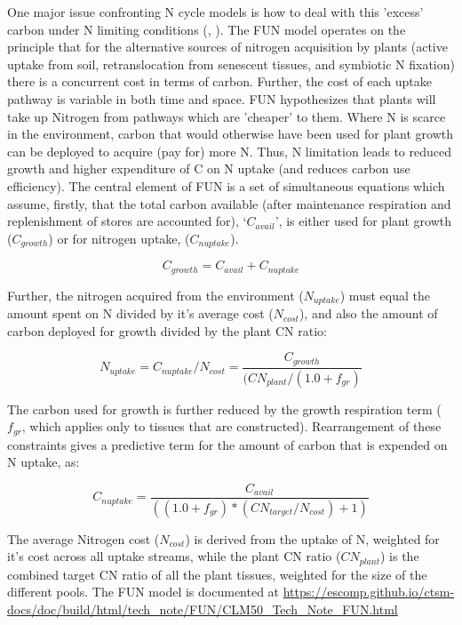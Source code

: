 \documentclass[draft,linenumbers]{agujournal}
\begin{document}
One major issue confronting N cycle models is how to deal with this 'excess' carbon under N limiting conditions (\cite{zaehle2010}, \cite{dekauwe2014}). The FUN model operates on the principle that for the alternative sources of nitrogen acquisition by plants (active uptake from soil, retranslocation from senescent tissues, and symbiotic N fixation) there is a concurrent cost in terms of carbon. Further, the cost of each uptake pathway is variable in both time and space. FUN hypothesizes that plants will take up Nitrogen from pathways which are 'cheaper' to them. Where N is scarce in the environment, carbon that would otherwise have been used for plant growth can be deployed to acquire (pay for) more N. Thus, N limitation leads to reduced growth and higher expenditure of C on N uptake (and reduces carbon use efficiency).  The central element of FUN is a set of simultaneous equations which assume, firstly, that the total carbon available (after maintenance respiration and replenishment of stores are accounted for), `$C_{avail}$', is either used for plant growth ($C_{growth}$) or for nitrogen uptake, ($C_{nuptake}$).

\begin{equation}
C_{growth}=C_{avail}+C_{nuptake}
\end{equation}

Further, the nitrogen acquired from the environment ($N_{uptake}$) must equal the amount spent on N divided by it's average cost ($N_{cost}$), and also the amount of carbon deployed for growth divided by the plant CN ratio:


\begin{equation}
N_{uptake}=C_{nuptake}/N_{cost} =\frac{C_{growth}}{(CN_{plant}/(1.0+f_{gr})}
\end{equation}

The carbon used for growth is further reduced by the growth respiration term ($f_{gr}$, which applies only to tissues that are constructed). Rearrangement of these constraints gives a predictive term for the amount of carbon that is expended on N uptake, as:

\begin{equation}
C_{nuptake} =\frac{C_{avail}}{ ( (1.0+f_{gr})*(CN_{target} / N_{cost}) + 1) }
\end{equation}


The average Nitrogen cost ($N_{cost}$) is derived from the uptake of N, weighted for it's cost across all uptake streams, while the plant CN ratio ($CN_{plant}$) is the combined target CN ratio of all the plant tissues, weighted for the size of the different pools. The FUN model is documented at \url{https://escomp.github.io/ctsm-docs/doc/build/html/tech_note/FUN/CLM50_Tech_Note_FUN.html}
\end{document}
